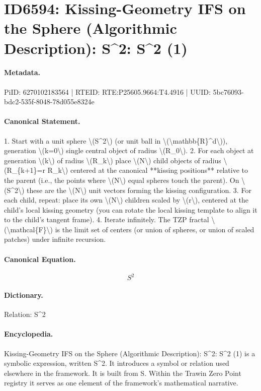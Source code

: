 \section*{ID6594: Kissing-Geometry IFS on the Sphere (Algorithmic Description): S\textasciicircum{}2: S\textasciicircum{}2 (1)}
\paragraph{Metadata.}
PiID: 6270102183564 | RTEID: RTE:P25605.9664:T4.4916 | UUID: 5bc76093-bdc2-535f-8048-78d055e8324e

\paragraph{Canonical Statement.}
1. Start with a unit sphere \textbackslash{}(S\textasciicircum{}2\textbackslash{}) (or unit ball in \textbackslash{}(\textbackslash{}mathbb\{R\}\textasciicircum{}d\textbackslash{})), generation \textbackslash{}(k=0\textbackslash{}) single central object of radius \textbackslash{}(R\_0\textbackslash{}). 2. For each object at generation \textbackslash{}(k\textbackslash{}) of radius \textbackslash{}(R\_k\textbackslash{}) place \textbackslash{}(N\textbackslash{}) child objects of radius \textbackslash{}(R\_\{k+1\}=r R\_k\textbackslash{}) centered at the canonical **kissing positions** relative to the parent (i.e., the points where \textbackslash{}(N\textbackslash{}) equal spheres touch the parent). On \textbackslash{}(S\textasciicircum{}2\textbackslash{}) these are the \textbackslash{}(N\textbackslash{}) unit vectors forming the kissing configuration. 3. For each child, repeat: place its own \textbackslash{}(N\textbackslash{}) children scaled by \textbackslash{}(r\textbackslash{}), centered at the child’s local kissing geometry (you can rotate the local kissing template to align it to the child’s tangent frame). 4. Iterate infinitely. The TZP fractal \textbackslash{}(\textbackslash{}mathcal\{F\}\textbackslash{}) is the limit set of centers (or union of spheres, or union of scaled patches) under infinite recursion.

\paragraph{Canonical Equation.}
\[
S^2
\]

\paragraph{Dictionary.}
Relation: S\textasciicircum{}2

\paragraph{Encyclopedia.}
Kissing-Geometry IFS on the Sphere (Algorithmic Description): S\textasciicircum{}2: S\textasciicircum{}2 (1) is a symbolic expression, written S\textasciicircum{}2. It introduces a symbol or relation used elsewhere in the framework. It is built from S. Within the Trawin Zero Point registry it serves as one element of the framework's mathematical narrative.

